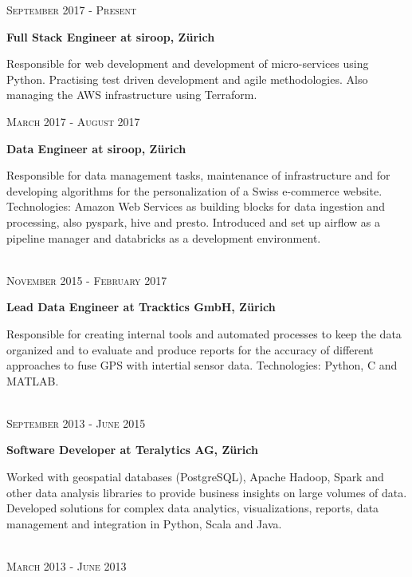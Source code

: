 \documentclass[10pt]{article} %
\begin{document}
\begin{minipage}[t]{0.5\textwidth}
{\raggedleft\textsc{September 2017 - Present}\par}

{\raggedright\large \textbf{Full Stack Engineer at siroop, Z\"urich}\\
}

\normalsize{Responsible for web development and development of micro-services using Python. Practising test driven development and agile methodologies. Also managing the AWS infrastructure using Terraform.}
\\
{\raggedleft\textsc{March 2017 - August 2017}\par}

{\raggedright\large \textbf{Data Engineer at siroop, Z\"urich}\\
}

\normalsize{Responsible for data management tasks, maintenance of infrastructure and for developing algorithms for the personalization of a Swiss e-commerce website. Technologies: Amazon Web Services as building blocks for data ingestion and processing, also pyspark, hive and presto. Introduced and set up airflow as a pipeline manager and databricks as a development environment.}
\\
\\
{\raggedleft\textsc{November 2015 - February 2017}\par}

{\raggedright\large \textbf{Lead Data Engineer at Tracktics GmbH, Z\"urich}\\
}

\normalsize{ Responsible for creating internal tools and automated processes to keep the data organized and to evaluate and produce reports for the accuracy of different approaches to fuse GPS with intertial sensor data. Technologies: Python, C and MATLAB.}
\\
\\
{\raggedleft\textsc{September 2013 - June 2015}\par}

{\raggedright\large \textbf{Software Developer at Teralytics AG, Z\"urich}\\
}

\normalsize{Worked with geospatial databases (PostgreSQL), Apache Hadoop, Spark and other data analysis libraries to provide business insights on large volumes of data. Developed solutions for complex data analytics, visualizations, reports, data management and integration in Python, Scala and Java.}
\\
\\
{\raggedleft\textsc{March 2013 - June 2013}\par}


\end{minipage}
\end{document}
